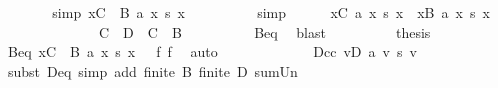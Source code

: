 \begin{isabellebody}
\ \ \ \ \isamarkupfalse%
\ \isamarkupfalse%
\ {\isacharbrackleft}{\kern0pt}simp{\isacharbrackright}{\kern0pt}{\isacharcolon}{\kern0pt}\ {\isachardoublequoteopen}{\isacharparenleft}{\kern0pt}{\isasymSum}x{\isasymin}C\ {\isacharminus}{\kern0pt}\ B{\isachardot}{\kern0pt}\ a\ x\ {\isacharasterisk}{\kern0pt}s\ x{\isacharparenright}{\kern0pt}\ {\isacharequal}{\kern0pt}\ {}{\isachardoublequoteclose}\isanewline
\ \ \ \ \ \ \isamarkupfalse%
\ simp\isanewline
\ \ \ \ \isamarkupfalse%
\ {\isachardoublequoteopen}{\isacharparenleft}{\kern0pt}{\isasymSum}x{\isasymin}C{\isachardot}{\kern0pt}\ a\ x\ {\isacharasterisk}{\kern0pt}s\ x{\isacharparenright}{\kern0pt}\ {\isacharequal}{\kern0pt}\ {\isacharparenleft}{\kern0pt}{\isasymSum}x{\isasymin}B{\isachardot}{\kern0pt}\ a\ x\ {\isacharasterisk}{\kern0pt}s\ x{\isacharparenright}{\kern0pt}{\isachardoublequoteclose}\isanewline
\ \ \ \ \isamarkupfalse%
\ {\isacharminus}{\kern0pt}\isanewline
\ \ \ \ \ \ \isamarkupfalse%
\ {\isachardoublequoteopen}C\ {\isacharminus}{\kern0pt}\ D\ {\isacharequal}{\kern0pt}\ C\ {\isacharminus}{\kern0pt}\ B{\isachardoublequoteclose}\isanewline
\ \ \ \ \ \ \ \ \isamarkupfalse%
\ Beq\ \isamarkupfalse%
\ blast\isanewline
\ \ \ \ \ \ \isamarkupfalse%
\ \isamarkupfalse%
\ {\isacharquery}{\kern0pt}thesis\isanewline
\ \ \ \ \ \ \ \ \isamarkupfalse%
\ Beq\ {\isacartoucheopen}{\isacharparenleft}{\kern0pt}{\isasymSum}x{\isasymin}C\ {\isacharminus}{\kern0pt}\ B{\isachardot}{\kern0pt}\ a\ x\ {\isacharasterisk}{\kern0pt}s\ x{\isacharparenright}{\kern0pt}\ {\isacharequal}{\kern0pt}\ {}{\isacartoucheclose}\ f{}\ f{}\ \isamarkupfalse%
\ auto\isanewline
\ \ \ \ \isamarkupfalse%
\isanewline
\ \ \ \ \isamarkupfalse%
\ {}\ \isamarkupfalse%
\ Dcc{}{\isacharcolon}{\kern0pt}\ {\isachardoublequoteopen}{\isacharparenleft}{\kern0pt}{\isasymSum}v{\isasymin}D{\isachardot}{\kern0pt}\ a\ v\ {\isacharasterisk}{\kern0pt}s\ v{\isacharparenright}{\kern0pt}\ {\isacharequal}{\kern0pt}\ {}{\isachardoublequoteclose}\isanewline
\ \ \ \ \ \ \isamarkupfalse%
\ {\isacharparenleft}{\kern0pt}subst\ Deq{\isacharparenright}{\kern0pt}\ {\isacharparenleft}{\kern0pt}simp\ add{\isacharcolon}{\kern0pt}\ {\isacartoucheopen}finite\ B{\isacartoucheclose}\ {\isacartoucheopen}finite\ D{\isacartoucheclose}\ sum{\isacharunderscore}{\kern0pt}Un{\isacharparenright}{\kern0pt}\isanewline

\end{isabellebody}

